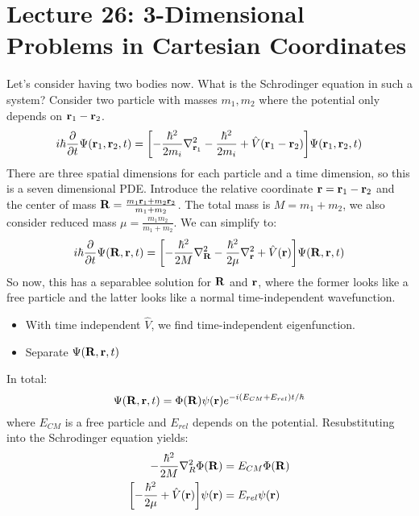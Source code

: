 \section{Lecture 26: 3-Dimensional Problems in Cartesian Coordinates}

Let's consider having two bodies now. What is the Schrodinger equation in such a system?
Consider two particle with masses $m_1, m_2$ where the potential only depends on $\mathbf{r}_1 - \mathbf{r}_2$.
\[ i\hbar \pdv{}{t} \Psi(\mathbf{r}_1, \mathbf{r}_2, t) = \qty[-\frac{\hbar^2}{2m_i} \nabla^2_{\mathbf{r}_1} - \frac{\hbar^2}{2m_i} + \hat{V}(\mathbf{r}_1 - \mathbf{r}_2)] \Psi(\mathbf{r}_1, \mathbf{r}_2, t) \]
There are three spatial dimensions for each particle and a time dimension, so this is a seven dimensional PDE. 
Introduce the relative coordinate $\mathbf{r} = \mathbf{r}_1 - \mathbf{r}_2$ and the center of mass $\mathbf{R} = \frac{m_1\mathbf{r}_1 + m_2\mathbf{r}_2}{m_1 + m_2}$.
The total mass is $M = m_1 + m_2$, we also consider reduced mass $\mu = \frac{m_1 m_2}{m_1 + m_2}$.
We can simplify to:
\[ i\hbar \pdv{}{t} \Psi(\mathbf{R}, \mathbf{r}, t) = \qty[-\frac{\hbar^2}{2M} \nabla_{\mathbf{R}}^2 - \frac{\hbar^2}{2\mu} \nabla_{\mathbf{r}}^2 + \hat{V}(\mathbf{r})] \Psi(\mathbf{R}, \mathbf{r}, t) \]
So now, this has a separablee solution for $\mathbf{R}$ and $\mathbf{r}$, where the former looks like a free particle and the latter
looks like a normal time-independent wavefunction.
\begin{itemize}
    \item With time independent $\hat{V}$, we find time-independent eigenfunction.
    \item Separate $\Psi(\mathbf{R}, \mathbf{r}, t)$
\end{itemize}
In total:
\[ \Psi(\mathbf{R}, \mathbf{r}, t) = \Phi(\mathbf{R}) \psi(\mathbf{r}) e^{-i(E_{CM} + E_{rel})t/\hbar}\]
where $E_{CM}$ is a free particle and $E_{rel}$ depends on the potential. Resubstituting into the Schrodinger equation yields:
\begin{align*}
    -\frac{\hbar^2}{2M} \nabla_R^2 \Phi(\mathbf{R}) &= E_{CM} \Phi(\mathbf{R}) \\
    \qty[-\frac{\hbar^2}{2\mu} + \hat{V}(\mathbf{r})] \psi(\mathbf{r}) &= E_{rel} \psi(\mathbf{r})
\end{align*}


